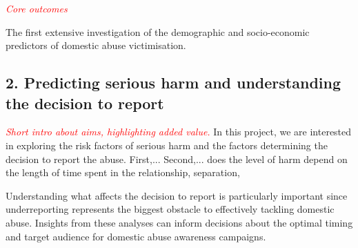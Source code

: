 \documentclass[11pt, a4paper]{article}
\begin{document}






\textcolor{red}{\textit{Core outcomes}} 

The first extensive investigation of the demographic and socio-economic predictors of domestic abuse victimisation.

\newpage


\subsection*{2. Predicting serious harm and understanding the decision to report}

 \textcolor{red}{\textit{Short intro about aims, highlighting added value.}} In this project, we are interested in exploring the risk factors of serious harm and the factors determining the decision to report the abuse. First,...
 Second,...
 does the level of harm depend on the length of time spent in the relationship, separation, 

Understanding what affects the decision to report is particularly important since underreporting represents the biggest obstacle to effectively tackling domestic abuse.
 Insights from these analyses can inform decisions about the optimal timing and target audience for domestic abuse awareness campaigns.
%
%
%
%
\end{document}
